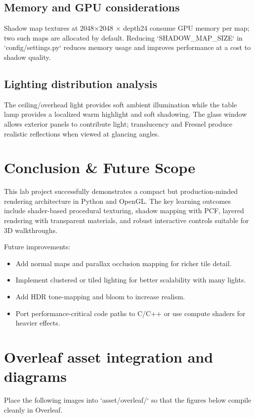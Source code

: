 \documentclass[12pt,a4paper]{report}
\begin{document}
\section{Memory and GPU considerations}
Shadow map textures at 2048×2048 × depth24 consume GPU memory per map; two such maps are allocated by default. Reducing `SHADOW_MAP_SIZE` in `config/settings.py` reduces memory usage and improves performance at a cost to shadow quality.

\section{Lighting distribution analysis}
The ceiling/overhead light provides soft ambient illumination while the table lamp provides a localized warm highlight and soft shadowing. The glass window allows exterior panels to contribute light; translucency and Fresnel produce realistic reflections when viewed at glancing angles.

\chapter{Conclusion \& Future Scope}

This lab project successfully demonstrates a compact but production-minded rendering architecture in Python and OpenGL. The key learning outcomes include shader-based procedural texturing, shadow mapping with PCF, layered rendering with transparent materials, and robust interactive controls suitable for 3D walkthroughs.

Future improvements:
\begin{itemize}
  \item Add normal maps and parallax occlusion mapping for richer tile detail.
  \item Implement clustered or tiled lighting for better scalability with many lights.
  \item Add HDR tone-mapping and bloom to increase realism.
  \item Port performance-critical code paths to C/C++ or use compute shaders for heavier effects.
\end{itemize}

\appendix
\chapter{Overleaf asset integration and diagrams}
Place the following images into `asset/overleaf/` so that the figures below compile cleanly in Overleaf.
\end{document}
